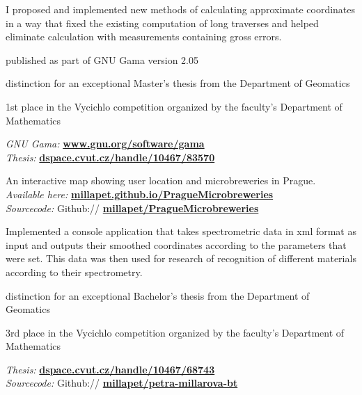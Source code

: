 \documentclass[letterpaper]{deedy-resume} %
\begin{document}
\begin{minipage}[t]{0.66\textwidth}

I proposed and implemented new methods of calculating approximate coordinates in a way that fixed the existing computation of long traverses and helped eliminate calculation with measurements containing gross errors.
\begin{tightitemize}
\item published as part of GNU Gama version 2.05
\item distinction for an exceptional Master's thesis from the Department of Geomatics
\item 1st place in the Vycichlo competition organized by the faculty's Department of Mathematics
\end{tightitemize}
\textit{GNU Gama:} \href{https://www.gnu.org/software/gama/}{\bf www.gnu.org/software/gama} \\
\textit{Thesis:} \href{https://dspace.cvut.cz/handle/10467/83570}{\bf dspace.cvut.cz/handle/10467/83570} 

\sectionspace %



An interactive map showing user location and microbreweries in Prague. \\
\textit{Available here:} \href{https://millapet.github.io/PragueMicrobreweries/}{\bf millapet.github.io/PragueMicrobreweries} \\
\textit{Sourcecode:} Github:// \href{https://github.com/millapet/PragueMicrobreweries}{\bf millapet/PragueMicrobreweries} 
\sectionspace %



Implemented a console application that takes spectrometric data in xml format as input and outputs their smoothed coordinates according to the parameters that were set. This data was then used for research of recognition of different materials according to their spectrometry.
\begin{tightitemize}
\item distinction for an exceptional Bachelor's thesis from the Department of Geomatics
\item 3rd place in the Vycichlo competition organized by the faculty's Department of Mathematics
\end{tightitemize}
\textit{Thesis:} \href{https://dspace.cvut.cz/handle/10467/68743}{\bf dspace.cvut.cz/handle/10467/68743} \\
\textit{Sourcecode:} Github:// \href{https://github.com/millapet/petra-millarova-bt}{\bf millapet/petra-millarova-bt} 



\end{minipage}
\end{document}
